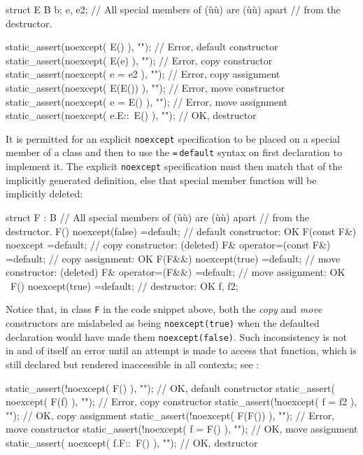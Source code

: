 \begin{emcppslisting}[emcppsbatch=e6]
struct E { B b; } e, e2;  // All special members of (ù{}ù) are (ù{}ù) apart
                          // from the destructor.

static_assert(noexcept( E()       ), "");  // Error, default constructor
static_assert(noexcept( E(e)      ), "");  // Error, copy constructor
static_assert(noexcept( e = e2    ), "");  // Error, copy assignment
static_assert(noexcept( E(E())    ), "");  // Error, move constructor
static_assert(noexcept( e = E()   ), "");  // Error, move assignment
static_assert(noexcept( e.E::~E() ), "");  // OK, destructor
\end{emcppslisting}
    

\noindent It is permitted for an explicit \lstinline!noexcept! specification to be
placed on a special member of a class and then to use the
\lstinline!=!\,\lstinline!default! syntax on first declaration to implement it. The
explicit \lstinline!noexcept! specification must then match that of the
implicitly generated definition, else that special member function will
be implicitly deleted:

\begin{emcppslisting}[emcppsbatch=e6]
struct F : B  // All special members of (ù{}ù) are (ù{}ù) apart
              // from the destructor.
{
    F() noexcept(false)    =default;  // default constructor: OK
    F(const F&) noexcept   =default;  // copy constructor:    (deleted)
    F& operator=(const F&) =default;  // copy assignment:     OK
    F(F&&) noexcept(true)  =default;  // move constructor:    (deleted)
    F& operator=(F&&)      =default;  // move assignment:     OK
    ~F() noexcept(true)    =default;  // destructor:          OK
} f, f2;
\end{emcppslisting}
    

\noindent Notice that, in class \lstinline!F! in the code snippet above, both the
\emph{copy} and \emph{move} constructors are mislabeled as being
\lstinline!noexcept(true)! when the defaulted declaration would have made
them \lstinline!noexcept(false)!. Such inconsistency is not in and of
itself an error until an attempt is made to access that function, which
is still declared but rendered inaccessible in all contexts; see
:

\begin{emcppslisting}[emcppsbatch=e6]
static_assert(!noexcept( F()       ), "");   // OK,    default constructor
static_assert( noexcept( F(f)      ),  "");  // Error, copy constructor
static_assert(!noexcept( f = f2    ), "");   // OK,    copy assignment
static_assert(!noexcept( F(F())    ), "");   // Error, move constructor
static_assert(!noexcept( f = F()   ), "");   // OK,    move assignment
static_assert( noexcept( f.F::~F() ),  "");  // OK,    destructor
\end{emcppslisting}
    


